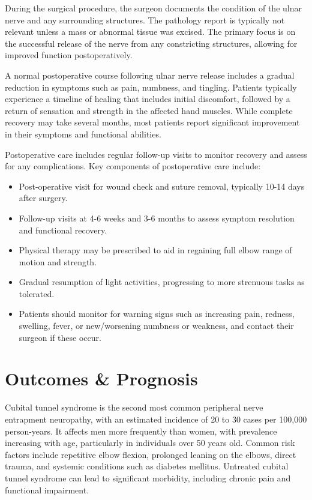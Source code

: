 During the surgical procedure, the surgeon documents the condition of the ulnar nerve and any surrounding structures. The pathology report is typically not relevant unless a mass or abnormal tissue was excised. The primary focus is on the successful release of the nerve from any constricting structures, allowing for improved function postoperatively.

A normal postoperative course following ulnar nerve release includes a gradual reduction in symptoms such as pain, numbness, and tingling. Patients typically experience a timeline of healing that includes initial discomfort, followed by a return of sensation and strength in the affected hand muscles. While complete recovery may take several months, most patients report significant improvement in their symptoms and functional abilities.

Postoperative care includes regular follow-up visits to monitor recovery and assess for any complications. Key components of postoperative care include:

\begin{itemize}
  \item Post-operative visit for wound check and suture removal, typically 10-14 days after surgery.
  \item Follow-up visits at 4-6 weeks and 3-6 months to assess symptom resolution and functional recovery.
  \item Physical therapy may be prescribed to aid in regaining full elbow range of motion and strength.
  \item Gradual resumption of light activities, progressing to more strenuous tasks as tolerated.
  \item Patients should monitor for warning signs such as increasing pain, redness, swelling, fever, or new/worsening numbness or weakness, and contact their surgeon if these occur.
\end{itemize}

\section*{Outcomes \& Prognosis}
Cubital tunnel syndrome is the second most common peripheral nerve entrapment neuropathy, with an estimated incidence of 20 to 30 cases per 100,000 person-years. It affects men more frequently than women, with prevalence increasing with age, particularly in individuals over 50 years old. Common risk factors include repetitive elbow flexion, prolonged leaning on the elbows, direct trauma, and systemic conditions such as diabetes mellitus. Untreated cubital tunnel syndrome can lead to significant morbidity, including chronic pain and functional impairment.

